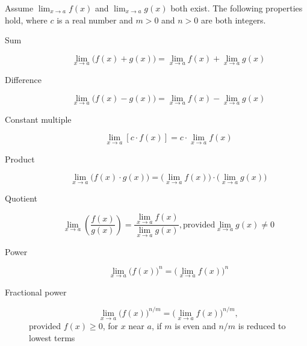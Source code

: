 \documentclass[nooutcomes, handout]{ximera}
\begin{document}
  Assume $\lim_{x \to a} f(x)$ and $\lim_{x \to a} g(x)$ both exist.
  The following properties hold, where $c$ is a real number and $m > 0$ and $n > 0$ are both integers.
  \begin{description}
      \item[Sum]
        \[
          \lim_{x \to a} \bigl(f(x) + g(x)\bigr) = \lim_{x \to a} f(x) + \lim_{x \to a} g(x)
        \]

      \item[Difference]
        \[
          \lim_{x \to a} \bigl(f(x) - g(x)\bigr) = \lim_{x \to a} f(x) - \lim_{x \to a} g(x)
        \]

      \item[Constant multiple]
        \[
          \lim_{x \to a} \left[c \cdot f(x) \right] = c \cdot \lim_{x \to a} f(x)
        \]

      \item[Product]
        \[
          \lim_{x \to a} \bigl(f(x) \cdot g(x)\bigr) = \bigl(\lim_{x \to a} f(x)\bigr) \cdot \bigl(\lim_{x \to a} g(x) \bigr)
        \]

      \item[Quotient]
        \[
          \lim_{x \to a} \left(\frac{f(x)}{g(x)}\right) = \frac{\lim_{x \to a} f(x)}{\lim_{x \to a} g(x)}, \text{provided} \lim_{x \to a} g(x) \ne 0
        \]   

      \item[ Power]
        \[
          \lim_{x \to a} \bigl(f(x)\bigr)^n = \bigl(\lim_{x \to a} f(x)\bigr)^n
        \]

      \item[Fractional power]
        \[
          \lim_{x \to a} \bigl(f(x)\bigr)^{n/m} = \bigl(\lim_{x \to a} f(x)\bigr)^{n/m},
        \]
        provided $f(x) \ge 0$, for $x$ near $a$, if $m$ is even and $n/m$ is reduced to lowest terms
    \end{description}
\end{document}
